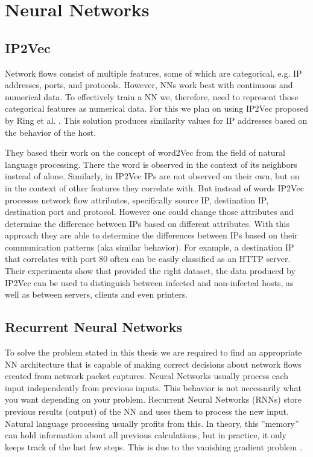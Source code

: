 \documentclass[
	ngerman,
	ruledheaders=section,%
	class=report,%
	thesis={type=bachelor},%
	accentcolor=9c,%
	custommargins=true,%
	marginpar=false,%
	parskip=half-,%
	fontsize=11pt,%
]{tudapub}
\begin{document}

\section{Neural Networks}

\subsection{IP2Vec}

Network flows consist of multiple features, some of which are categorical, e.g. IP addresses, ports, and protocols.
However, NNs work best with continuous and numerical data.
To effectively train a NN we, therefore, need to represent those categorical features as numerical data.
For this we plan on using IP2Vec proposed by Ring et al. \cite{ringIP2VecLearningSimilarities2017}.
This solution produces similarity values for IP addresses based on the behavior of the host.

They based their work on the concept of word2Vec from the field of natural language processing.
There the word is observed in the context of its neighbors instead of alone.
Similarly, in IP2Vec IPs are not observed on their own, but on in the context of other features they correlate with.
But instead of words IP2Vec processes network flow attributes,
specifically source IP, destination IP, destination port and protocol.
However one could change those attributes and determine the difference between IPs based on different attributes.
With this approach they are able to determine the differences between IPs based on their communication patterns (aka similar behavior).
For example, a destination IP that correlates with port 80 often can be easily classified as an HTTP server.
Their experiments show that provided the right dataset, the data produced by IP2Vec can be used to distinguish between infected and non-infected hosts, as well as between servers, clients and even printers.

\subsection{Recurrent Neural Networks}

To solve the problem stated in this thesis we are required to find an appropriate NN architecture
that is capable of making correct decisions about network flows created from network packet captures.
Neural Networks usually process each input independently from previous inputs.
This behavior is not necessarily what you want depending on your problem.
Recurrent Neural Networks (RNNs) store previous results (output) of the NN and uses them to process the new input.
Natural language processing usually profits from this.
In theory, this ''memory'' can hold information about all previous calculations,
but in practice, it only keeps track of the last few steps.
This is due to the vanishing gradient problem \cite{hochreiterLongShortTermMemory1997}.
\end{document}
